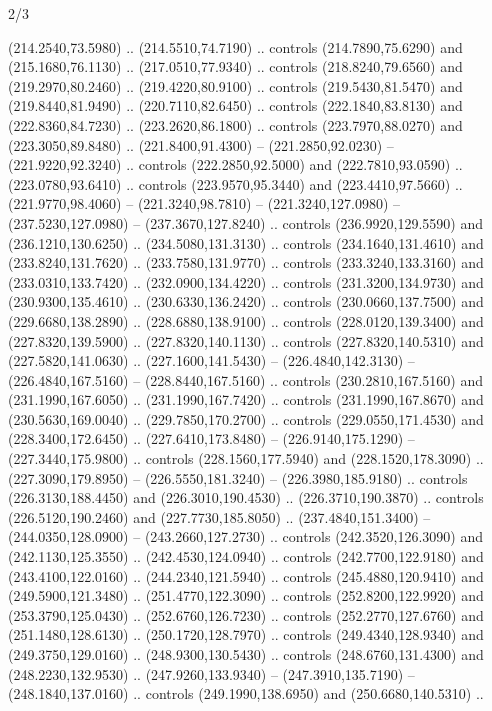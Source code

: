 \begin{flagdescription}{2/3}
\begin{scope}[xshift=0.5\flaglength,yshift=0.5\flagwidth,scale=\stretchfactor]
\begin{scope}[scale=0.001645\flagwidth,yshift=65mm,xshift=-63mm]
\begin{scope}[y=0.80pt, x=0.80pt, yscale=-1,]
\begin{scope}[cm={{1.33333,0.0,0.0,1.33333,(0.0,1e-05)}}]
  (214.2540,73.5980) .. (214.5510,74.7190) .. controls (214.7890,75.6290) and
  (215.1680,76.1130) .. (217.0510,77.9340) .. controls (218.8240,79.6560) and
  (219.2970,80.2460) .. (219.4220,80.9100) .. controls (219.5430,81.5470) and
  (219.8440,81.9490) .. (220.7110,82.6450) .. controls (222.1840,83.8130) and
  (222.8360,84.7230) .. (223.2620,86.1800) .. controls (223.7970,88.0270) and
  (223.3050,89.8480) .. (221.8400,91.4300) -- (221.2850,92.0230) --
  (221.9220,92.3240) .. controls (222.2850,92.5000) and (222.7810,93.0590) ..
  (223.0780,93.6410) .. controls (223.9570,95.3440) and (223.4410,97.5660) ..
  (221.9770,98.4060) -- (221.3240,98.7810) -- (221.3240,127.0980) --
  (237.5230,127.0980) -- (237.3670,127.8240) .. controls (236.9920,129.5590) and
  (236.1210,130.6250) .. (234.5080,131.3130) .. controls (234.1640,131.4610) and
  (233.8240,131.7620) .. (233.7580,131.9770) .. controls (233.3240,133.3160) and
  (233.0310,133.7420) .. (232.0900,134.4220) .. controls (231.3200,134.9730) and
  (230.9300,135.4610) .. (230.6330,136.2420) .. controls (230.0660,137.7500) and
  (229.6680,138.2890) .. (228.6880,138.9100) .. controls (228.0120,139.3400) and
  (227.8320,139.5900) .. (227.8320,140.1130) .. controls (227.8320,140.5310) and
  (227.5820,141.0630) .. (227.1600,141.5430) -- (226.4840,142.3130) --
  (226.4840,167.5160) -- (228.8440,167.5160) .. controls (230.2810,167.5160) and
  (231.1990,167.6050) .. (231.1990,167.7420) .. controls (231.1990,167.8670) and
  (230.5630,169.0040) .. (229.7850,170.2700) .. controls (229.0550,171.4530) and
  (228.3400,172.6450) .. (227.6410,173.8480) -- (226.9140,175.1290) --
  (227.3440,175.9800) .. controls (228.1560,177.5940) and (228.1520,178.3090) ..
  (227.3090,179.8950) -- (226.5550,181.3240) -- (226.3980,185.9180) .. controls
  (226.3130,188.4450) and (226.3010,190.4530) .. (226.3710,190.3870) .. controls
  (226.5120,190.2460) and (227.7730,185.8050) .. (237.4840,151.3400) --
  (244.0350,128.0900) -- (243.2660,127.2730) .. controls (242.3520,126.3090) and
  (242.1130,125.3550) .. (242.4530,124.0940) .. controls (242.7700,122.9180) and
  (243.4100,122.0160) .. (244.2340,121.5940) .. controls (245.4880,120.9410) and
  (249.5900,121.3480) .. (251.4770,122.3090) .. controls (252.8200,122.9920) and
  (253.3790,125.0430) .. (252.6760,126.7230) .. controls (252.2770,127.6760) and
  (251.1480,128.6130) .. (250.1720,128.7970) .. controls (249.4340,128.9340) and
  (249.3750,129.0160) .. (248.9300,130.5430) .. controls (248.6760,131.4300) and
  (248.2230,132.9530) .. (247.9260,133.9340) -- (247.3910,135.7190) --
  (248.1840,137.0160) .. controls (249.1990,138.6950) and (250.6680,140.5310) ..

\end{scope}
\end{scope}
\end{scope}
\end{scope}
\end{flagdescription}
